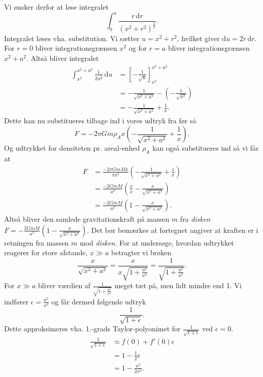\documentclass[12pt]{article}
\theoremstyle{definition}
\begin{document}
Vi ønsker derfor at løse integralet
\[ 
\int_{0}^{a} \frac{r \, \mathrm{d}r}{\left( x^2 + r^2 \right)^{\frac{3}{2}}}
.\]
Integralet løses vha. substitution. Vi sætter $u = x^2 + r^2$, hvilket giver $\mathrm{d}u = 2r \, \mathrm{d}r$. For $r = 0$ bliver integrationsgrænsen $x^2$ og for $r = a$ bliver integrationsgrænsen $x^2 + a^2$. Altså bliver integralet
\begin{align*}
  \int_{x^2}^{x^2 + a^2} \frac{1}{2u^{\frac{3}{2}}} \, \mathrm{d}u &= \left[ - \frac{1}{\sqrt{u}} \right]_{x^2}^{x^2 + a^2} \\
  &= -\frac{1}{\sqrt{x^2 + a^2}} - \left( - \frac{1}{\sqrt{x^2}} \right) \\
  &= -\frac{1}{\sqrt{x^2 + a^2}} + \frac{1}{x}
.\end{align*}
Dette kan nu substitueres tilbage ind i vores udtryk fra før så
\[ 
F = -2\pi G m \rho_A x \left(- \frac{1}{\sqrt{x^2 + a^2}} + \frac{1}{x} \right)
.\]
Og udtrykket for densiteten pr. areal-enhed $\rho_A$ kan også substitueres ind så vi får at
\begin{align*}
  F &= \frac{-2\pi G m M x}{\pi a^2} \left( - \frac{1}{\sqrt{x^2 + a^2}} + \frac{1}{x} \right) \\
    &= \frac{-2 G m M}{a^2} \left( \frac{x}{x} - \frac{x}{\sqrt{x^2 + a^2}} \right) \\
    &= \frac{-2 G m M}{a^2} \left( 1 - \frac{x}{\sqrt{x^2 + a^2}} \right)
.\end{align*}
Altså bliver den samlede gravitationskraft på massen $m$ fra \textit{disken} \underline{\underline{$F = -\frac{2G m M}{a^2} \left( 1 - \frac{x}{\sqrt{x^2 + a^2}} \right)$}}. Det bør bemærkes at fortegnet angiver at kraften er i retningen fra massen $m$ mod \textit{disken}. For at undersøge, hvordan udtrykket reagerer for store afstande, $x \gg a$ betragter vi brøken
\[ 
\frac{x}{\sqrt{x^2 + a^2}} = \frac{x}{x \sqrt{1 + \frac{a^2}{x^2}}} = \frac{1}{\sqrt{1 + \frac{a^2}{x^2}}}
.\]
For $x \gg a$ bliver værdien af $\frac{1}{\sqrt{1 + \frac{a^2}{x^2}}}$ meget tæt på, men lidt mindre end 1. Vi indfører $\epsilon = \frac{a^2}{x^2}$ og får dermed følgende udtryk
\[ 
  \frac{1}{\sqrt{1 + \epsilon}}
.\]
Dette approksimeres vha. 1.-grads Taylor-polyonimet for $\frac{1}{\sqrt{1 + \epsilon}}$ ved $\epsilon = 0$.
\begin{align*}
  \frac{1}{\sqrt{1 + \epsilon}} &\approx f(0) + f'(0)\epsilon \\
  &= 1 - \frac{1}{2} \epsilon \\
  &= 1 - \frac{a^2}{2x^2}
.\end{align*}
\end{document}
